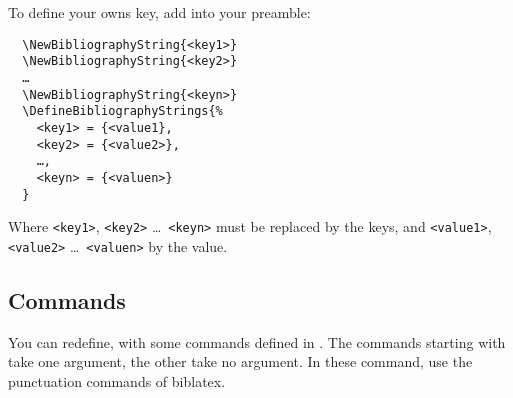 \documentclass{ltxdockit}[2011/03/25]
\newcommand{\biblatex}{biblatex\xspace}
\newcommand{\meta}[1]{\texttt{<#1>}}
\begin{document}
To define your owns key, add into your preamble:
\begin{verbatim}
  \NewBibliographyString{<key1>}
  \NewBibliographyString{<key2>}
  …
  \NewBibliographyString{<keyn>}
  \DefineBibliographyStrings{%
    <key1> = {<value1},
    <key2> = {<value2>},
    …,
    <keyn> = {<valuen>}
  }

\end{verbatim}
 
Where \meta{key1}, \meta{key2} \ldots\ \meta{keyn} must be replaced by the keys, and \meta{value1}, \meta{value2} \ldots\ \meta{valuen} by the value.
 

\subsection{Commands}

You can redefine, with  some commands defined in . The commands starting with  take one argument, the other take no argument. In these command, use the punctuation commands of \biblatex.
\end{document}
